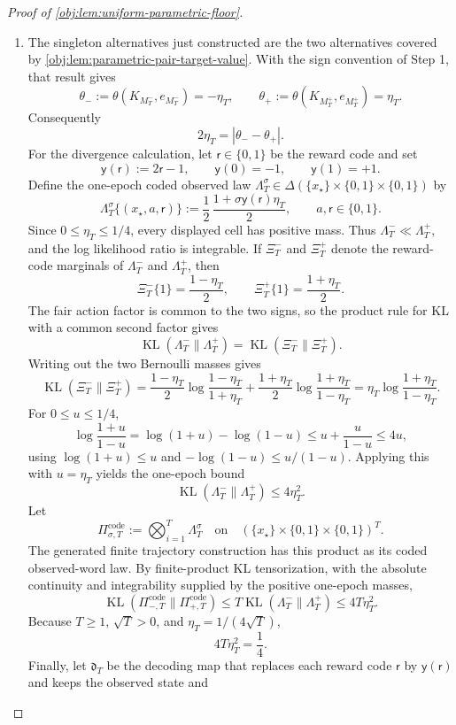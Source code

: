 \begin{proof}[Proof of \cref{obj:lem:uniform-parametric-floor}]
\begin{enumerate}
\item The singleton alternatives just constructed are the two alternatives covered
by \cref{obj:lem:parametric-pair-target-value}.  With the sign convention of
Step 1, that result gives
\[
\theta_-
:=\theta(K_{M_T^-},e_{M_T^-})
=-\eta_T,
\qquad
\theta_+
:=\theta(K_{M_T^+},e_{M_T^+})
=\eta_T.
\]
Consequently
\[
2\eta_T
=
|\theta_{-}-\theta_{+}|.
\]
For the divergence calculation, let \(\mathsf r\in\{0,1\}\) be the reward code
and set
\[
\mathsf y(\mathsf r):=2\mathsf r-1,
\qquad
\mathsf y(0)=-1,
\qquad
\mathsf y(1)=+1.
\]
Define the one-epoch coded observed law
\(\Lambda_T^\sigma\in\Delta(\{x_\star\}\times\{0,1\}\times\{0,1\})\) by
\[
\Lambda_T^\sigma\{(x_\star,a,\mathsf r)\}
:=
\frac12\,\frac{1+\sigma\mathsf y(\mathsf r)\eta_T}{2},
\qquad a,\mathsf r\in\{0,1\}.
\]
Since \(0\le\eta_T\le1/4\), every displayed cell has positive mass.  Thus
\(\Lambda_T^-\ll\Lambda_T^+\), and the log likelihood ratio is integrable.  If
\(\Xi_T^-\) and \(\Xi_T^+\) denote the reward-code marginals of
\(\Lambda_T^-\) and \(\Lambda_T^+\), then
\[
\Xi_T^-\{1\}=\frac{1-\eta_T}{2},
\qquad
\Xi_T^+\{1\}=\frac{1+\eta_T}{2}.
\]
The fair action factor is common to the two signs, so the product rule for KL
with a common second factor gives
\[
\operatorname{KL}(\Lambda_T^-\|\Lambda_T^+)
=
\operatorname{KL}(\Xi_T^-\|\Xi_T^+).
\]
Writing out the two Bernoulli masses gives
\[
\operatorname{KL}(\Xi_T^-\|\Xi_T^+)
=
\frac{1-\eta_T}{2}\log\frac{1-\eta_T}{1+\eta_T}
+
\frac{1+\eta_T}{2}\log\frac{1+\eta_T}{1-\eta_T}
=
\eta_T\log\frac{1+\eta_T}{1-\eta_T}.
\]
For \(0\le u\le1/4\),
\[
\log\frac{1+u}{1-u}
=
\log(1+u)-\log(1-u)
\le
u+\frac{u}{1-u}
\le 4u,
\]
using \(\log(1+u)\le u\) and \(-\log(1-u)\le u/(1-u)\).  Applying this with
\(u=\eta_T\) yields the one-epoch bound
\[
\operatorname{KL}(\Lambda_T^-\|\Lambda_T^+)
\le 4\eta_T^2.
\]
Let
\[
\Pi_{\sigma,T}^{\mathrm{code}}
:=
\bigotimes_{i=1}^T\Lambda_T^\sigma
\quad\text{on}\quad
(\{x_\star\}\times\{0,1\}\times\{0,1\})^T.
\]
The generated finite trajectory construction has this product as its coded
observed-word law.  By finite-product KL tensorization, with the absolute
continuity and integrability supplied by the positive one-epoch masses,
\[
\operatorname{KL}(\Pi_{-,T}^{\mathrm{code}}\|
\Pi_{+,T}^{\mathrm{code}})
\le
T\operatorname{KL}(\Lambda_T^-\|\Lambda_T^+)
\le
4T\eta_T^2.
\]
Because \(T\ge1\), \(\sqrt T>0\), and \(\eta_T=1/(4\sqrt T)\),
\[
4T\eta_T^2=\frac14.
\]
Finally, let \(\mathfrak d_T\) be the decoding map that replaces each reward
code \(\mathsf r\) by \(\mathsf y(\mathsf r)\) and keeps the observed state and

\end{enumerate}
\end{proof}
